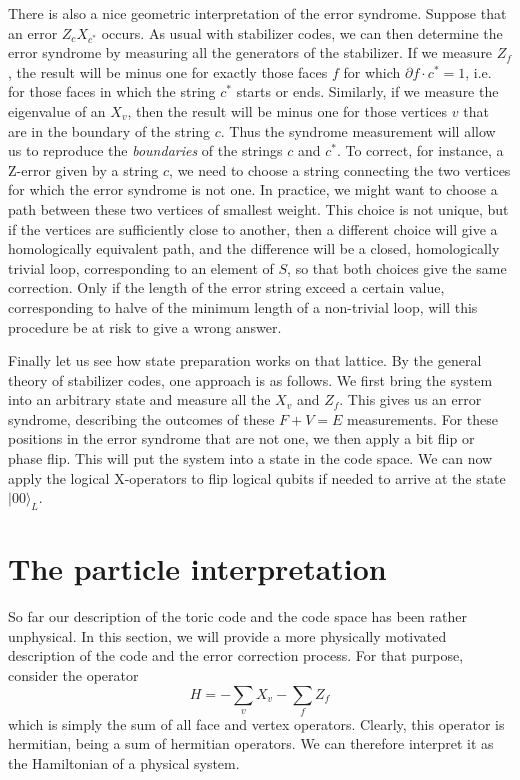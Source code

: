 \documentclass[a4paper, draft]{article}
\theoremstyle{own}
\theoremstyle{remark}
\begin{document}
There is also a nice geometric interpretation of the error syndrome. Suppose that an error $Z_c X_{c^*}$ occurs. As usual with stabilizer codes, we can then determine the error syndrome by measuring all the generators of the stabilizer. If we measure $Z_f$, the result will be minus one for exactly those faces $f$ for which $\partial f \cdot c^* = 1$, i.e. for those faces in which the string $c^*$ starts or ends. Similarly, if we measure the eigenvalue of an $X_v$, then the result will be minus one for those vertices $v$ that are in the boundary of the string $c$. Thus the syndrome measurement will allow us to reproduce the \emph{boundaries} of the strings $c$ and $c^*$. To correct, for instance, a Z-error given by a string $c$, we need to choose a string connecting the two vertices for which the error syndrome is not one. In practice, we might want to choose a path between these two vertices of smallest weight. This choice is not unique, but if the vertices are sufficiently close to another, then a different choice will give a homologically equivalent path, and the difference will be a closed, homologically trivial loop, corresponding to an element of $S$, so that both choices give the same correction. Only if the length of the error string exceed a certain value, corresponding to halve of the minimum length of a non-trivial loop, will this procedure be at risk to give a wrong answer. 

Finally let us see how state preparation works on that lattice. By the general theory of stabilizer codes, one approach is as follows. We first bring the system into an arbitrary state and measure all the $X_v$ and $Z_f$. This gives us an error syndrome, describing the outcomes of these $F + V = E$ measurements. For these positions in the error syndrome that are not one, we then apply a bit flip or phase flip. This will put the system into a state in the code space. We can now apply the logical X-operators to flip logical qubits if needed to arrive at the state $|0 0\rangle_L$. 


\section{The particle interpretation}

So far our description of the toric code and the code space has been rather unphysical. In this section, we will provide a more physically motivated description of the code and the error correction process. For that purpose, consider the operator
$$
H = - \sum_v X_v - \sum_f Z_f
$$
which is simply the sum of all face and vertex operators. Clearly, this operator is hermitian, being a sum of hermitian operators. We can therefore interpret it as the Hamiltonian of a physical system.
\end{document}
